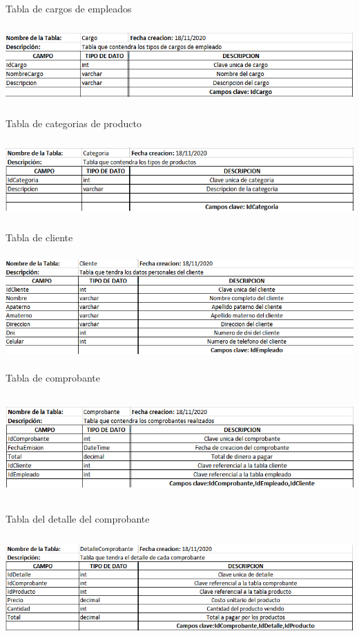 \documentclass[12pt,letterpaper]{article}
\begin{document}
Tabla de cargos de empleados
\begin{center}
    \includegraphics[width=14cm, height=3cm]{img/cargo.png}  
\end{center}
Tabla de categorias de producto
\begin{center}
    \includegraphics[width=14cm, height=3cm]{img/categoria.png}  
\end{center}
\newpage
Tabla de cliente
\begin{center}
    \includegraphics[width=14cm, height=4cm]{img/cliente.png}  
\end{center}
Tabla de comprobante
\begin{center}
    \includegraphics[width=14cm, height=4cm]{img/comprobante.png}  
\end{center}
Tabla del detalle del comprobante
\begin{center}
    \includegraphics[width=14cm, height=4cm]{img/detalle.png}  
\end{center}
\end{document}
